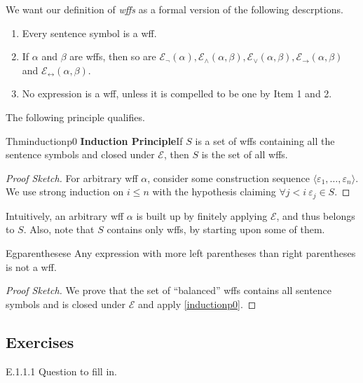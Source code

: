 We want our definition of \textit{wffs} as a formal version of the following descrptions.

\begin{enumerate}
  \item Every sentence symbol is a wff.
  \item If $\alpha$ and $\beta$ are wffs, then so are $\mathcal{E}_{\neg}(\alpha), \mathcal{E}_{\wedge}(\alpha,\beta), \mathcal{E}_{\vee}(\alpha,\beta), \mathcal{E}_{\rightarrow}(\alpha,\beta)$ and $\mathcal{E}_{\leftrightarrow}(\alpha,\beta)$.
  \item No expression is a wff, unless it is compelled to be one by Item 1 and 2.
\end{enumerate}

The following principle qualifies.

\begin{reference}{Thm}{inductionp0}
  \textbf{Induction Principle}\quad If $S$ is a set of wffs containing all the sentence symbols and closed under $\mathcal{E}$, then $S$ is the set of all wffs.
\end{reference}

\begin{proof}[Proof Sketch]
  For arbitrary wff $\alpha$, consider some construction sequence $\langle \varepsilon_1,\dots,\varepsilon_n\rangle$. We use strong induction on $i\leq n$ with the hypothesis claiming $\forall j<i\ \varepsilon_j\in S$.
\end{proof}

Intuitively, an arbitrary wff $\alpha$ is built up by finitely applying $\mathcal{E}$, and thus belongs to $S$. Also, note that $S$ contains only wffs, by starting upon some of them.

\begin{reference}{Eg}{parenthesese}
  Any expression with more left parentheses than right parentheses is not a wff.
\end{reference}

\begin{proof}[Proof Sketch]
  We prove that the set of ``balanced'' wffs contains all sentence symbols and is closed under $\mathcal{E}$ and apply \ref{inductionp0}.
\end{proof}

\subsection*{Exercises}

\begin{exercise}{E.1.1.1}
  Question to fill in.
\end{exercise}

